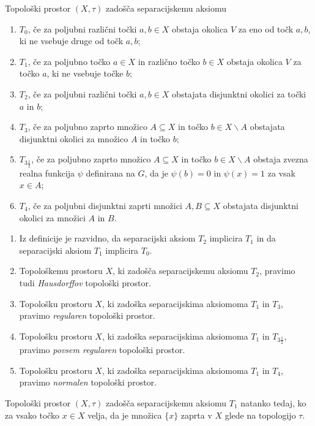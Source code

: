 \documentclass[mat1]{fmfdelo}
\begin{document}
\begin{definicija}\label{def:sepaks}
	Topološki prostor $(X, \tau)$ zadošča separacijskemu aksiomu
	\begin{enumerate}
		\item $T_0$, če za poljubni različni točki $a, b \in X$ obstaja okolica $V$ za eno od točk $a, b$, ki ne vsebuje druge od točk $a, b$;
		\item $T_1$, če za poljubno točko $a \in X$ in različno točko $b \in X$ obstaja okolica $V$ za točko $a$, ki ne vsebuje točke $b$;
		\item $T_2$, če za poljubni različni točki $a, b \in X$ obstajata disjunktni okolici za točki $a$ in $b$;
		\item $T_3$, če za poljubno zaprto množico $A \subseteq X$ in točko $b \in X\backslash A$ obstajata disjunktni okolici za množico $A$ in točko $b$;
		\item $T_{3 \frac{1}{2}}$, če za poljubno zaprto množico $A \subseteq X$ in točko $b \in X\backslash A$ obstaja zvezna realna funkcija $\psi$ definirana na $G$, da je $\psi (b) = 0$ in $\psi (x) = 1$ za vsak $x \in A$;
		\item $T_4$, če za poljubni disjunktni zaprti množici $A, B \subseteq X$ obstajata disjunktni okolici za množici $A$ in $B$.
	\end{enumerate}
\end{definicija}

\begin{opomba}
	\begin{enumerate}
		\item Iz definicije je razvidno, da separacijski aksiom $T_2$ implicira $T_1$ in da separacijski aksiom $T_1$ implicira $T_0$.
		\item Topološkemu prostoru $X$, ki zadošča separacijskemu aksiomu $T_2$, pravimo tudi \emph{Hausdorffov} topološki prostor.
		\item Topološku prostoru $X$, ki zadoška separacijskima aksiomoma $T_1$ in $T_3$, pravimo \emph{regularen} topološki prostor.
		\item Topološku prostoru $X$, ki zadoška separacijskima aksiomoma $T_1$ in $T_{3 \frac{1}{2}}$, pravimo \emph{povsem regularen} topološki prostor.
		\item Topološku prostoru $X$, ki zadoška separacijskima aksiomoma $T_1$ in $T_4$, pravimo \emph{normalen} topološki prostor.
	\end{enumerate}
\end{opomba}

\begin{trditev}\label{def:kart1}
	Topološki prostor $(X, \tau)$ zadošča separacijskemu aksiomu $T_1$ natanko tedaj, ko za vsako točko $x \in X$ velja, da je množica $\lbrace x \rbrace$ zaprta v $X$ glede na topologijo $\tau$.
\end{trditev}
\end{document}

